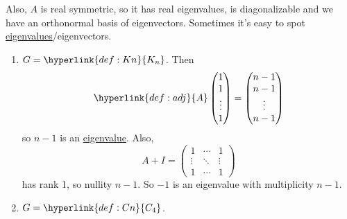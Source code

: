 \documentclass{article}
\begin{document}
Also, \hyperlink{def:adj}{$A$} is real symmetric, so it has real eigenvalues, is diagonalizable and we have an orthonormal basis of eigenvectors.
Sometimes it's easy to spot \hyperlink{def:eigen}{eigenvalues}/eigenvectors.
\begin{eg}\leavevmode
    \begin{enumerate}[label=\arabic*)]
        \item $G=\hyperlink{def:Kn}{K_n}$. Then
            \begin{equation*}
                \hyperlink{def:adj}{A}
                \begin{pmatrix}
                    1 \\ 1 \\ \vdots \\ 1
                \end{pmatrix} =
                \begin{pmatrix}
                    n-1 \\n-1 \\ \vdots \\ n-1
                \end{pmatrix}
            \end{equation*}
            so $n-1$ is an \hyperlink{def:eigen}{eigenvalue}. Also,
            \begin{equation*}
                A + I =
                \begin{pmatrix}
                    1 & \cdots & 1 \\
                    \vdots & \ddots & \vdots \\
                    1 & \cdots & 1
                \end{pmatrix}
            \end{equation*}
            has rank 1, so nullity $n-1$. So $-1$ is an eigenvalue with multiplicity $n-1$.
        \item $G=\hyperlink{def:Cn}{C_4}$.
            \begin{center}

\end{center}
\end{enumerate}
\end{eg}
\end{document}
